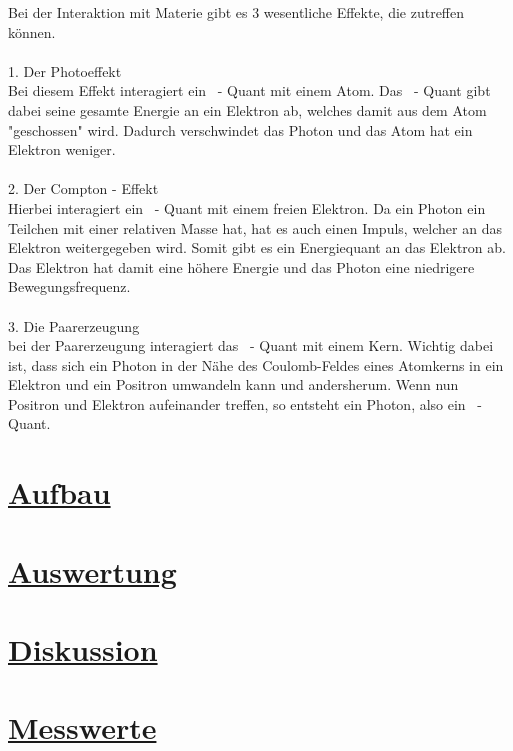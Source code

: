 \documentclass[11pt,a4paper]{article}
\begin{document}
Bei der Interaktion mit Materie gibt es 3 wesentliche Effekte, die zutreffen können.
\\\\
1. Der Photoeffekt \\
Bei diesem Effekt interagiert ein \gamma~- Quant mit einem Atom. Das \gamma~-
Quant gibt dabei seine gesamte Energie an ein Elektron ab, welches damit aus dem Atom
"geschossen" wird. Dadurch verschwindet das Photon und das Atom hat ein Elektron
weniger.
\\\\
2. Der Compton - Effekt \\
Hierbei interagiert ein \gamma~- Quant mit einem freien Elektron. Da ein Photon ein
Teilchen mit einer relativen Masse hat, hat es auch einen Impuls, welcher an das
Elektron weitergegeben wird. Somit gibt es ein Energiequant an das Elektron ab. Das
Elektron hat damit eine höhere Energie und das Photon eine niedrigere
Bewegungsfrequenz.
\\\\
3. Die Paarerzeugung \\
bei der Paarerzeugung interagiert das \gamma~- Quant mit einem Kern. Wichtig dabei
ist, dass sich ein Photon in der Nähe des Coulomb-Feldes eines Atomkerns in ein
Elektron und ein Positron umwandeln kann und andersherum. Wenn nun Positron und
Elektron aufeinander treffen, so entsteht ein Photon, also ein \gamma~- Quant.
\newpage
\section{\underline{Aufbau}}
\newpage
\section{\underline{Auswertung}}
\newpage
\section{\underline{Diskussion}}
\newpage
\section{\underline{Messwerte}}
 
\end{document}

